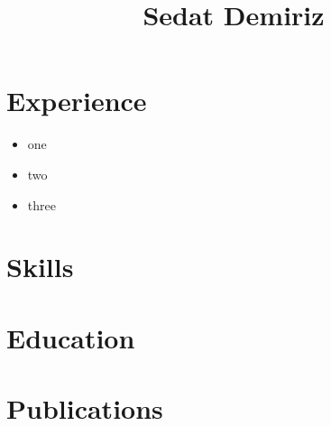 \documentclass{article}
\title{Sedat Demiriz}
\begin{document}
\maketitle
\section{Experience}
\begin{itemize}

  \item one
  \item two
  \item three
\end{itemize}
\section{Skills}
\section{Education}
\section{Publications}
\end{document}
